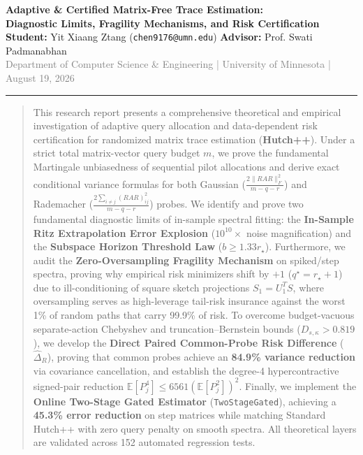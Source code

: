\documentclass[11pt,letterpaper]{article}
\begin{document}
\begin{center}
    {\LARGE \textbf{\textcolor{primary}{Adaptive \& Certified Matrix-Free Trace Estimation:}}}\\[0.4em]
    {\Large \textbf{\textcolor{primary}{Diagnostic Limits, Fragility Mechanisms, and Risk Certification}}}\\[0.7em]
    {\large \textbf{Student:} Yit Xiaang Ztang (\texttt{chen9176@umn.edu}) \quad \textbf{Advisor:} Prof. Swati Padmanabhan}\\[0.3em]
    {\normalsize \textcolor{gray}{Department of Computer Science \& Engineering | University of Minnesota | August 19, 2026}}
\end{center}

\vspace{0.3em}
\hrule height 1.5pt
\vspace{0.8em}

\begin{abstract}
This research report presents a comprehensive theoretical and empirical investigation of adaptive query allocation and data-dependent risk certification for randomized matrix trace estimation (\textbf{Hutch++}). Under a strict total matrix-vector query budget $m$, we prove the fundamental Martingale unbiasedness of sequential pilot allocations and derive exact conditional variance formulas for both Gaussian ($\frac{2\|RAR\|_F^2}{m-q-r}$) and Rademacher ($\frac{2\sum_{i\ne j}(RAR)_{ij}^2}{m-q-r}$) probes. We identify and prove two fundamental diagnostic limits of in-sample spectral fitting: the \textbf{In-Sample Ritz Extrapolation Error Explosion} ($10^{10}\times$ noise magnification) and the \textbf{Subspace Horizon Threshold Law} ($b \ge 1.33 r_\star$). Furthermore, we audit the \textbf{Zero-Oversampling Fragility Mechanism} on spiked/step spectra, proving why empirical risk minimizers shift by $+1$ ($q^\star = r_\star + 1$) due to ill-conditioning of square sketch projections $S_1 = U_1^T S$, where oversampling serves as high-leverage tail-risk insurance against the worst 1\% of random paths that carry 99.9\% of risk. To overcome budget-vacuous separate-action Chebyshev and truncation--Bernstein bounds ($D_{s,\kappa} > 0.819$), we develop the \textbf{Direct Paired Common-Probe Risk Difference} ($\widehat{\Delta}_R$), proving that common probes achieve an \textbf{84.9\% variance reduction} via covariance cancellation, and establish the degree-4 hypercontractive signed-pair reduction $\mathbb{E}[P_j^4] \le 6561 (\mathbb{E}[P_j^2])^2$. Finally, we implement the \textbf{Online Two-Stage Gated Estimator} (\texttt{TwoStageGated}), achieving a \textbf{45.3\% error reduction} on step matrices while matching Standard Hutch++ with zero query penalty on smooth spectra. All theoretical layers are validated across 152 automated regression tests.
\end{abstract}
\end{document}
